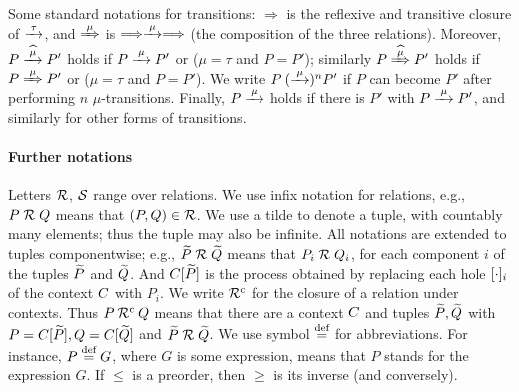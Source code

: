 Some standard notations for transitions:  $\Longrightarrow $ is the 
reflexive and  transitive closure of $\arr\tau $, and 
$\Arr \mu $ is $\Longrightarrow \arr\mu \Longrightarrow $ (the
composition of the three relations).
Moreover,   
$ 
P \arcap \mu P'$ holds if $P \arr\mu P'$ or ($\mu =\tau$ and
$P=P'$); similarly 
$ 
P \Arcap \mu P'$ holds if $P \Arr\mu P'$ or ($\mu =\tau$ and
$P=P'$).
We write $P \:(\arr\mu)^n P'$ if $P$ can become $P'$ after performing
$n$ $\mu$-transitions. Finally, $P \arr\mu$ holds if there is $P'$
with $P \arr\mu P'$, and similarly for other forms of transitions.




\paragraph{Further notations}
Letters  $\R$, $\S$ range over relations.
We use infix notation for relations, e.g., 
$P \RR Q$ means that $(P,Q) \in \R$.
We use a tilde to denote a tuple, with countably many elements; thus
the tuple may also be infinite.
 All
notations  are  extended to tuples componentwise;
e.g., $\til P \RR \til Q$ means that $P_i \RR Q_i$, for  each  
component $i$  of the tuples $\til P$ and $\til Q$.
And $\ct{\til P}$ is the process obtained by replacing each hole
$\holei i$ of the  context $\qct$ with $P_i$.  
We write $
\ctx \R$ for the closure of a relation under contexts. Thus $P\: \ctx \R\: Q$
means that there are a context $\qct$ and tuples $\til P,\til Q$ with
$P =  \ct{\til P}, Q =  \ct{\til Q}$ and    $\til P \RR \til Q$.
We use  symbol 
$\DSdefi$ for abbreviations. For instance, $P \DSdefi G $, where
$G$ is some expression, means that  $P$ stands
for the  expression
$G$.
If $\leq$ is a preorder, then  $\geq$  is its inverse (and
conversely).

